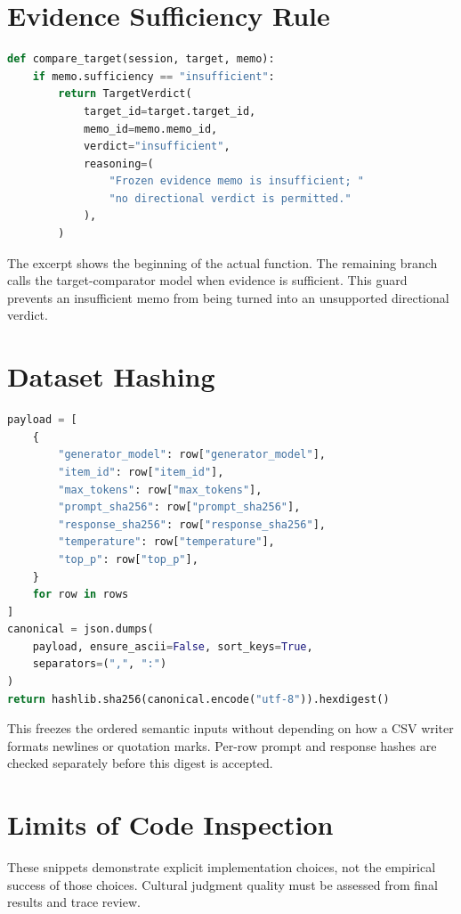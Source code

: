 \section{Evidence Sufficiency Rule}
\begin{lstlisting}[language=Python,caption={Insufficient-evidence guard in src/cultverify/scoring.py.}]
def compare_target(session, target, memo):
    if memo.sufficiency == "insufficient":
        return TargetVerdict(
            target_id=target.target_id,
            memo_id=memo.memo_id,
            verdict="insufficient",
            reasoning=(
                "Frozen evidence memo is insufficient; "
                "no directional verdict is permitted."
            ),
        )
\end{lstlisting}
The excerpt shows the beginning of the actual function. The remaining branch calls the target-comparator model when evidence is sufficient. This guard prevents an insufficient memo from being turned into an unsupported directional verdict.
\section{Dataset Hashing}
\begin{lstlisting}[language=Python,caption={Canonical semantic hash from scripts/run_final_experiment.py.}]
payload = [
    {
        "generator_model": row["generator_model"],
        "item_id": row["item_id"],
        "max_tokens": row["max_tokens"],
        "prompt_sha256": row["prompt_sha256"],
        "response_sha256": row["response_sha256"],
        "temperature": row["temperature"],
        "top_p": row["top_p"],
    }
    for row in rows
]
canonical = json.dumps(
    payload, ensure_ascii=False, sort_keys=True,
    separators=(",", ":")
)
return hashlib.sha256(canonical.encode("utf-8")).hexdigest()
\end{lstlisting}
This freezes the ordered semantic inputs without depending on how a CSV writer formats newlines or quotation marks. Per-row prompt and response hashes are checked separately before this digest is accepted.
\section{Limits of Code Inspection}
These snippets demonstrate explicit implementation choices, not the empirical success of those choices. Cultural judgment quality must be assessed from final results and trace review.